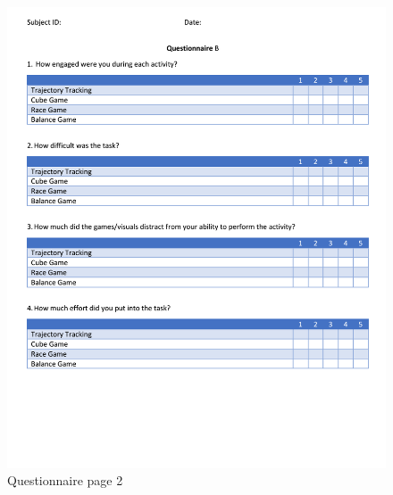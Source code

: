 \documentclass[12pt]{report}
\begin{document}
\begin{figure}[p] 
	\centering
	\includegraphics[width=\linewidth]{questionnaire_p2}
	\caption{Questionnaire page 2}
	\label{fig:q_p2}
\end{figure}
\end{document}
